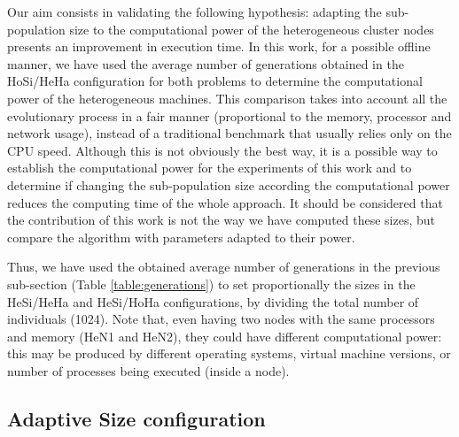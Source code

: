 Our aim consists in validating the following hypothesis: adapting the
sub-population size to the computational power of the heterogeneous
cluster nodes presents an improvement in execution time. %
In this work, for a possible offline manner, %
we have used the average number of generations obtained in the
HoSi/HeHa configuration for both problems to determine the
computational power of the heterogeneous machines. This comparison
takes into account all the evolutionary process in a fair manner
(proportional to the memory, processor and network usage), instead of a
traditional benchmark that usually relies only on the CPU
speed. %
 Although this is not obviously the best way, %
 it is a possible
way to establish the computational power for the experiments of this
work and to determine if changing the sub-population size according
the computational power reduces the computing time of the whole
approach. It should be considered that the contribution of this work
is not the way we have computed these sizes, but compare the algorithm
with parameters adapted to their power. %

Thus, we have used the obtained average number of generations in the
previous sub-section (Table \ref{table:generations}) to set
proportionally the sizes in the HeSi/HeHa and HeSi/HoHa
configurations, by dividing the total number of individuals
(1024). Note that, even having two nodes with the same processors and
memory (HeN1 and HeN2), they could have different computational power:
this may be produced by different operating systems, virtual machine
versions, or number of processes being executed (inside a node). %



\subsection{Adaptive Size configuration}

